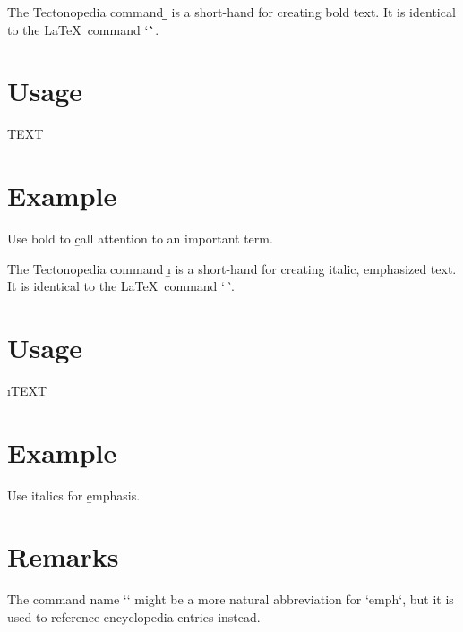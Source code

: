 
The Tectonopedia command \b{\string\b} is a short-hand for creating bold text.
It is identical to the \LaTeX\ command \tex`\textbf`.

\section*{Usage}

\begin{texdisp}
\b{TEXT}
\end{texdisp}

\section*{Example}

\begin{texdisp}
Use bold to \b{call attention} to an important term.
\end{texdisp}


\tduxEmit %



The Tectonopedia command \b{\string\i} is a short-hand for creating italic,
emphasized text. It is identical to the \LaTeX\ command \tex`\emph`.

\section*{Usage}

\begin{texdisp}
\i{TEXT}
\end{texdisp}

\section*{Example}

\begin{texdisp}
Use italics for \b{emphasis}.
\end{texdisp}

\section*{Remarks}

The command name \tex`\e` might be a more natural abbreviation for \tex`emph`,
but it is used to reference encyclopedia entries instead.
